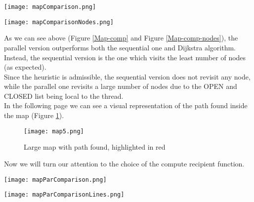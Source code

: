\begin{center} 
    \begin{minipage}[b]{0.45\textwidth}
        \centering
        \texttt{[image: mapComparison.png]}
        \label{Map-comp}
    \end{minipage} 
    \hspace{0.5cm}
    \begin{minipage}[b]{0.45\textwidth}
        \centering
        \texttt{[image: mapComparisonNodes.png]}
        \label{Map-comp-nodes}
    \end{minipage} 
\end{center}
As we can see above (Figure \ref{Map-comp} and Figure \ref{Map-comp-nodes}), the parallel version outperforms both the sequential one and Dijkstra algorithm.
\\
Instead, the sequential version is the one which visits the least number of nodes (as expected).
\\
Since the heuristic is admissible, the sequential version does not revisit any node, while the parallel one revisits a large number of nodes due to the OPEN and CLOSED list being local to the thread.
\\
In the following page we can see a visual representation of the path found inside the map (Figure \ref{large-map}).
\newpage
\begin{figure}
    \centering
    \texttt{[image: map5.png]}
    \caption{Large map with path found, highlighted in red}
    \label{large-map}
\end{figure}
\noindent Now we will turn our attention to the choice of the compute recipient function.
\begin{center} 
    \begin{minipage}[b]{0.5\textwidth}
            \centering
            \texttt{[image: mapParComparison.png]}
            \label{Map-par-comp}
        
    \end{minipage}%
    \hspace{1cm}
    \begin{minipage}[b]{0.4\textwidth}
            \centering
            \texttt{[image: mapParComparisonLines.png]}
            \label{Map-par-comp-lines}
    \end{minipage} 
\end{center}

